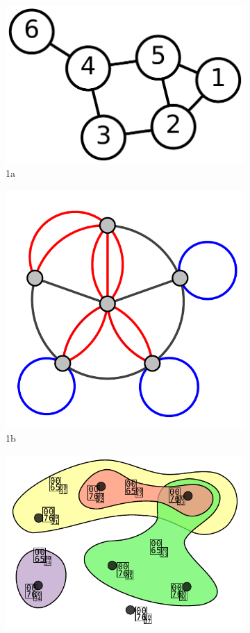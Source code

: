 \documentclass{book}
\begin{document}
\begin{figure}
\begin{subfigure}{.5\textwidth}
        \label{fig:sfig2}
    \end{subfigure}
    \begin{subfigure}{.5\textwidth}
        \centering
        \includegraphics[width=.8\linewidth]{assets/images/6n-graf.svg.pdf}
        \caption{1a}
        \label{fig:sfig1}
    \end{subfigure}%
    \begin{subfigure}{.5\textwidth}
        \centering
        \includegraphics[width=.8\linewidth]{assets/images/Multi-pseudograph.svg.pdf}
        \caption{1b}
        \label{fig:sfig2}
    \end{subfigure}
    \begin{subfigure}{.5\textwidth}
        \centering
        \includegraphics[width=.8\linewidth]{assets/images/Hypergraph-wikipedia.svg.pdf}

\end{subfigure}
\end{figure}
\end{document}
